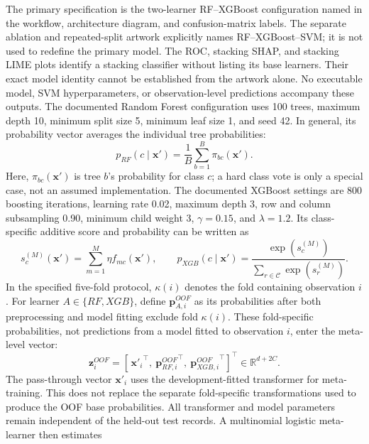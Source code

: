 \documentclass[a4paper,fleqn]{cas-dc}
\begin{document}
The primary specification is the two-learner RF--XGBoost configuration named in the workflow, architecture diagram, and confusion-matrix labels. The separate ablation and repeated-split artwork explicitly names RF--XGBoost--SVM; it is not used to redefine the primary model. The ROC, stacking SHAP, and stacking LIME plots identify a stacking classifier without listing its base learners. Their exact model identity cannot be established from the artwork alone. No executable model, SVM hyperparameters, or observation-level predictions accompany these outputs. The documented Random Forest configuration uses 100 trees, maximum depth 10, minimum split size 5, minimum leaf size 1, and seed 42. In general, its probability vector averages the individual tree probabilities:
\begin{equation}
p_{RF}(c\mid\mathbf{x}')=\frac{1}{B}\sum_{b=1}^{B}
\pi_{bc}(\mathbf{x}').
\label{eq:rf}
\end{equation}
Here, $\pi_{bc}(\mathbf{x}')$ is tree $b$'s probability for class $c$; a hard class vote is only a special case, not an assumed implementation. The documented XGBoost settings are 800 boosting iterations, learning rate 0.02, maximum depth 3, row and column subsampling 0.90, minimum child weight 3, $\gamma=0.15$, and $\lambda=1.2$. Its class-specific additive score and probability can be written as
\begin{equation}
s_c^{(M)}(\mathbf{x}')=\sum_{m=1}^{M}\eta f_{mc}(\mathbf{x}'),
\qquad
p_{XGB}(c\mid\mathbf{x}')=
\frac{\exp(s_c^{(M)})}{\sum_{r\in\mathcal{C}}\exp(s_r^{(M)})}.
\label{eq:xgb}
\end{equation}
In the specified five-fold protocol, $\kappa(i)$ denotes the fold containing observation $i$. For learner $A\in\{RF,XGB\}$, define $\mathbf{p}_{A,i}^{OOF}$ as its probabilities after both preprocessing and model fitting exclude fold $\kappa(i)$. These fold-specific probabilities, not predictions from a model fitted to observation $i$, enter the meta-level vector:
\begin{equation}
\mathbf{z}^{OOF}_i=\left[\,{\mathbf{x}'_i}^{\!\top},\
{\mathbf{p}_{RF,i}^{OOF}}^{\!\top},\
{\mathbf{p}_{XGB,i}^{OOF}}^{\!\top}\right]^{\!\top}
\in\mathbb{R}^{d+2C}.
\label{eq:oofvector}
\end{equation}
The pass-through vector $\mathbf{x}'_i$ uses the development-fitted transformer for meta-training. This does not replace the separate fold-specific transformations used to produce the OOF base probabilities. All transformer and model parameters remain independent of the held-out test records. A multinomial logistic meta-learner then estimates
\end{document}

